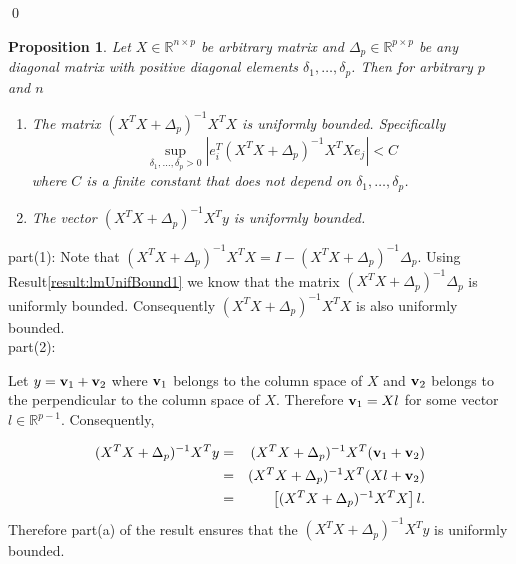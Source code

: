 \documentclass[noinfoline,11pt]{imsart}
\numberwithin{equation}{section}
\theoremstyle{plain}
\newtheorem{prop}{Proposition}[section]
\newcommand{\lmDelta}{\Delta}
\newcommand{\lmdelta}{\delta}
\newcommand{\lmX}{X}
\newcommand{\lmy}{y}
\newcommand{\R}{\mathbb{R}}
\newcommand{\lmA}{A}
\newcommand{\lmxv}{{\bf v}}
\begin{document}
 
 \qed
\vspace{.2in }

\begin{prop}\label{result:lmUnifBound2}
Let $\lmX\in \R^{n\times p}$ be arbitrary matrix and $\lmDelta_p\in \R^{p\times p}$ be any diagonal matrix with positive diagonal elements $\lmdelta_1, \ldots, \lmdelta_p$. Then for arbitrary $p$ and $n$ 
\begin{enumerate}
\item The matrix $ \left( \lmX^T\lmX+\lmDelta_p \right)^{-1} \lmX^T\lmX  $ is uniformly bounded. Specifically 
$$ \sup_{\lmdelta_1, \ldots, \lmdelta_p>0}\left\vert e_{i}^T  \left( \lmX^T\lmX+\lmDelta_p \right)^{-1} \lmX^T\lmX e_j \right\vert<C  $$
where $C$ is a finite constant that does not depend on $\lmdelta_1, \ldots, \lmdelta_p$. 
\item The vector $ \left( \lmX^T\lmX+\lmDelta_p \right)^{-1} \lmX^T\lmy$ is uniformly bounded.
\end{enumerate}
\end{prop}

\proof

part(1):
Note that $ \left(\lmX^T\lmX+\lmDelta_p \right)^{-1} \lmX^T\lmX= I-\left(\lmX^T\lmX+\lmDelta_p \right)^{-1}  \lmDelta_p$. Using Result\ref{result:lmUnifBound1} we know that the matrix $\left(\lmX^T\lmX+\lmDelta_p \right)^{-1}  \lmDelta_p$ is uniformly bounded. Consequently $\left(\lmX^T\lmX+\lmDelta_p \right)^{-1} \lmX^T\lmX$ is also uniformly bounded. \\

part(2):

Let $\lmy=\lmxv_1+ \lmxv_2$ where $\lmxv_1$ belongs to the column space of $\lmX$ and $\lmxv_2$ belongs to the perpendicular to the column space of $\lmX$. Therefore $\lmxv_1=\lmX l $ for some vector  $l\in \R^{p-1}$. Consequently, 

\begin{eqnarray}\label{eq:lmUNIFpartRow}
(\lmX^T\lmX+\lmDelta_{p})^{-1}\lmX^T\lmy
& = &  (\lmX^T\lmX+\lmDelta_{p})^{-1}\lmX^T( \lmxv_1+\lmxv_2  ) \nonumber\\
& =&   (\lmX^T\lmX+\lmDelta_{p})^{-1}\lmX^T( \lmX l +\lmxv_2 ) \nonumber\\
& =&   \left[(\lmX^T\lmX+\lmDelta_{p})^{-1}\lmX^T\lmX \right]l .\nonumber
\end{eqnarray}
Therefore part(a) of the result ensures that the $(\lmX^T\lmX+\lmDelta_{p})^{-1}\lmX^T\lmy$ is uniformly bounded. 
\end{document}
